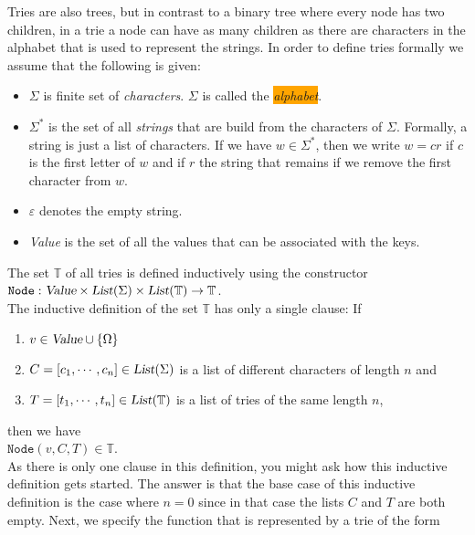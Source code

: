 Tries are also trees, but in contrast to a binary tree where every node has two children, in a trie a
node can have as many children as there are characters in the alphabet that is used to represent the
strings.  In order to define tries formally we assume that the following is given:
\begin{itemize}
\item $\Sigma$ is finite set of \emph{characters}. $\Sigma$ is called the
      \colorbox{orange}{\emph{alphabet}}. 
\item $\Sigma^*$ is the set of all \emph{strings} that are build from the characters of $\Sigma$.
      Formally, a string is just a list of characters.  If we have $w \in \Sigma^*$, then we write $w = cr$
      if $c$ is the first letter of $w$ and if $r$ the string that remains if we remove the first
      character from $w$.
\item $\varepsilon$ denotes the empty string.
\item \textsl{Value} is the set of all the values that can be associated with the keys.  
\end{itemize}
The set $\mathbb{T}$ of all tries is defined inductively using the constructor \\[0.2cm]
\hspace*{1.3cm} 
$\texttt{Node}: \textsl{Value} \times \textsl{List}(\Sigma) \times
\textsl{List}(\mathbb{T}) \rightarrow \mathbb{T}$. 
\\[0.2cm]
The inductive definition of the set $\mathbb{T}$ has only a single clause: If
\begin{enumerate}
\item $v \in \textsl{Value} \cup \{\Omega\}$
\item $C = [c_1, \cdots, c_n] \in \textsl{List}(\Sigma)$ is a list of different characters of length
      $n$ and
\item $T = [t_1, \cdots, t_n] \in \textsl{List}(\mathbb{T})$ is a list of  tries of the same length $n$, 
\end{enumerate}
then we have 
\\[0.2cm]
\hspace*{1.3cm}  $\texttt{Node}(v, C, T) \in \mathbb{T}$.  
\\[0.2cm]
As there is only one clause in this definition, you might ask how this inductive definition gets started.
The answer is that the base case of this inductive definition is the case where
$n=0$ since in that case the lists  $C$ and $T$ are both empty.
Next, we specify the function that is represented by a trie of the form 
